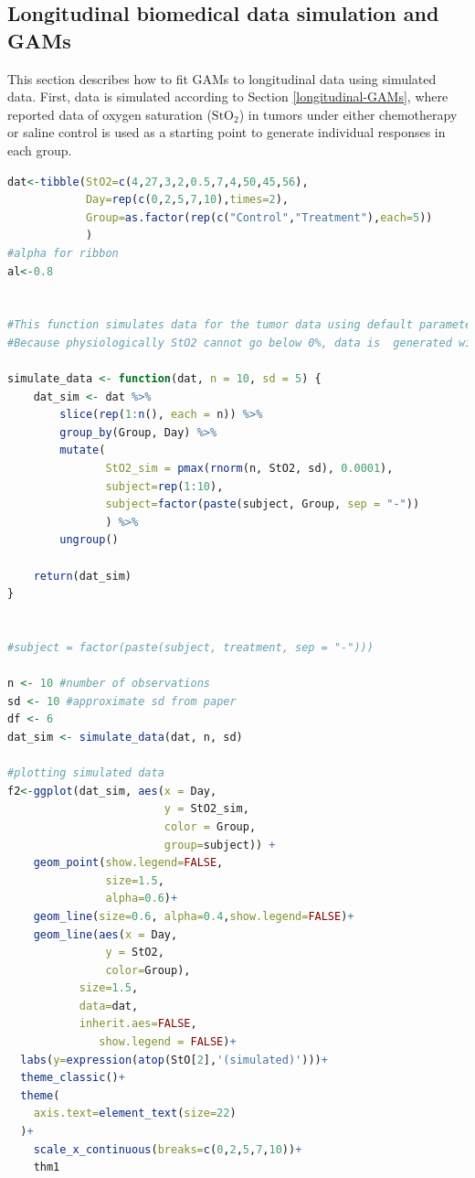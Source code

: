 \documentclass[
]{article}
\begin{document}
\hypertarget{tumor-data-simulation}{%
\subsection{Longitudinal biomedical data simulation and GAMs}\label{tumor-data-simulation}}

This section describes how to fit GAMs to longitudinal data using simulated data. First, data is simulated according to Section \ref{longitudinal-GAMs}, where reported data of oxygen saturation (\(\mbox{StO}_2\)) in tumors under either chemotherapy or saline control is used as a starting point to generate individual responses in each group.

\begin{lstlisting}[language=R]
dat<-tibble(StO2=c(4,27,3,2,0.5,7,4,50,45,56),
            Day=rep(c(0,2,5,7,10),times=2),
            Group=as.factor(rep(c("Control","Treatment"),each=5))
            )
#alpha for ribbon
al<-0.8


#This function simulates data for the tumor data using default parameters of 10 observations per time point,and Standard deviation (sd) of 5%.
#Because physiologically StO2 cannot go below 0%, data is  generated with a cutoff value of 0.0001 (the "StO2_sim")

simulate_data <- function(dat, n = 10, sd = 5) {
    dat_sim <- dat %>%
        slice(rep(1:n(), each = n)) %>%
        group_by(Group, Day) %>%
        mutate(
               StO2_sim = pmax(rnorm(n, StO2, sd), 0.0001),
               subject=rep(1:10),
               subject=factor(paste(subject, Group, sep = "-"))
               ) %>%
        ungroup()

    return(dat_sim)
}


#subject = factor(paste(subject, treatment, sep = "-")))

n <- 10 #number of observations
sd <- 10 #approximate sd from paper
df <- 6
dat_sim <- simulate_data(dat, n, sd)

#plotting simulated data
f2<-ggplot(dat_sim, aes(x = Day, 
                        y = StO2_sim, 
                        color = Group, 
                        group=subject)) +
    geom_point(show.legend=FALSE,
               size=1.5,
               alpha=0.6)+
    geom_line(size=0.6, alpha=0.4,show.legend=FALSE)+
    geom_line(aes(x = Day, 
               y = StO2,
               color=Group),
           size=1.5,
           data=dat,
           inherit.aes=FALSE,
              show.legend = FALSE)+
  labs(y=expression(atop(StO[2],'(simulated)')))+
  theme_classic()+
  theme(
    axis.text=element_text(size=22)
  )+
    scale_x_continuous(breaks=c(0,2,5,7,10))+
    thm1
\end{lstlisting}
\end{document}
